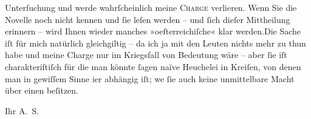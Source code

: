                   Unterſuchung und werde wahrſcheinlich meine \textsc{Charge}
                  verlieren. Wenn Sie die Novelle {\pb}noch nicht
                  kennen und ſie leſen werden – und ſich dieſer Mittheilung erinnern – wird Ihnen
                  wieder manches »oeſterreichiſche« klar
                     werden.\hspace*{1.5em}Die Sache iſt für mich natürlich
                  gleichgiltig – da ich ja mit den Leuten nichts mehr zu thun habe und meine Charge
                  nur im Kriegsfall von Bedeutung wäre – aber ſie iſt charakteriſtiſch für {\pb}die man könnte ſagen naïve Heuchelei in
                  Kreiſen, von denen man in gewiſſem Sinne i{\geminationm}er
                  abhängig iſt; we{\geminationn}{ }ſie auch keine unmittelbare Macht über einen
                  beſitzen.\pend
           
\pstart
           Ihr \spacefill\mbox{A. S.}\pend
           \endnumbering{}  
      